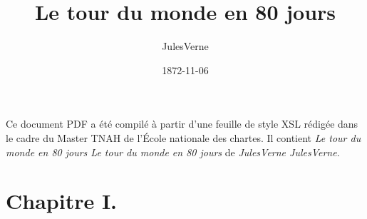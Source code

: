 \documentclass[12pt,a4paper,openany]{book}
\title{\textbf{Le tour du monde en 80 jours}}
\author{JulesVerne}
\date{1872-11-06}
\begin{document}
        
        \pagestyle{fancy}
        \fancyhf{}
        \fancyfoot[C]{\thepage}
        \renewcommand{\headrulewidth}{0pt}
        
        
        \maketitle
        
        
        \vspace*{3cm}
        \begin{Large}
        Ce document PDF a été compilé à partir d'une feuille de style XSL rédigée dans le cadre du Master TNAH de l'École nationale des chartes. Il contient \textit{Le tour du monde en 80 jours Le tour du monde en 80 jours} de  \textit{JulesVerne JulesVerne}.
        
            \end{Large}
       
       
            \newpage
            
            
            
            
            \chapter{Chapitre I.}
            
\end{document}
